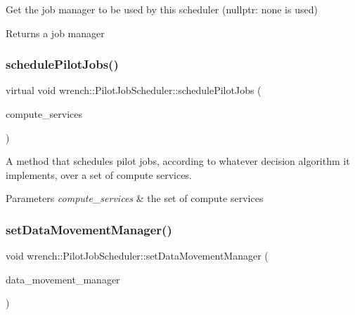 Get the job manager to be used by this scheduler (nullptr\+: none is used) 

\begin{DoxyReturn}{Returns}
a job manager 
\end{DoxyReturn}
\mbox{\label{classwrench_1_1_pilot_job_scheduler_a903c44145dfce2964f90cc856146adbb}} 
\subsubsection{\texorpdfstring{schedule\+Pilot\+Jobs()}{schedulePilotJobs()}}
{\footnotesize\ttfamily virtual void wrench\+::\+Pilot\+Job\+Scheduler\+::schedule\+Pilot\+Jobs (\begin{DoxyParamCaption}\item[{const std\+::set$<$ \hyperlink{classwrench_1_1_compute_service}{Compute\+Service} $\ast$$>$ \&}]{compute\+\_\+services }\end{DoxyParamCaption})\hspace{0.3cm}{\ttfamily [pure virtual]}}



A method that schedules pilot jobs, according to whatever decision algorithm it implements, over a set of compute services. 


\begin{DoxyParams}{Parameters}
{\em compute\+\_\+services} & the set of compute services \\
\hline
\end{DoxyParams}
\mbox{\label{classwrench_1_1_pilot_job_scheduler_a8b981e431951cd683c2ec404ac970d2c}} 
\subsubsection{\texorpdfstring{set\+Data\+Movement\+Manager()}{setDataMovementManager()}}
{\footnotesize\ttfamily void wrench\+::\+Pilot\+Job\+Scheduler\+::set\+Data\+Movement\+Manager (\begin{DoxyParamCaption}\item[{\hyperlink{classwrench_1_1_data_movement_manager}{Data\+Movement\+Manager} $\ast$}]{data\+\_\+movement\+\_\+manager }\end{DoxyParamCaption})\hspace{0.3cm}{\ttfamily [inline]}}



